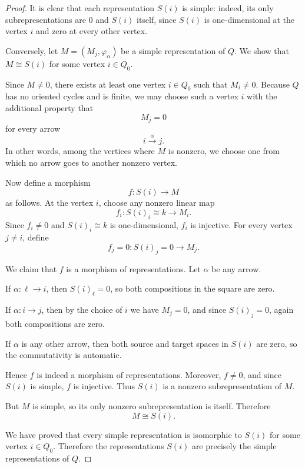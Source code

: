 \documentclass[11pt, a4paper]{report}
\begin{document}
\begin{proof}
    It is clear that each representation $S(i)$ is simple: indeed, its only
    subrepresentations are $0$ and $S(i)$ itself, since $S(i)$ is one-dimensional at
    the vertex $i$ and zero at every other vertex.

    Conversely, let $M=(M_j,\varphi_\alpha)$ be a simple representation of $Q$.
    We show that $M \cong S(i)$ for some vertex $i \in Q_0$.

    Since $M \neq 0$, there exists at least one vertex $i \in Q_0$ such that
    $M_i \neq 0$. Because $Q$ has no oriented cycles and is finite, we may choose
    such a vertex $i$ with the additional property that
    \[
        M_j = 0
    \]
    for every arrow
    \[
        i \xrightarrow{\alpha} j.
    \]
    In other words, among the vertices where $M$ is nonzero, we choose one from
    which no arrow goes to another nonzero vertex.

    Now define a morphism
    \[
        f:S(i)\longrightarrow M
    \]
    as follows. At the vertex $i$, choose any nonzero linear map
    \[
        f_i:S(i)_i \cong k \longrightarrow M_i.
    \]
    Since $f_i \neq 0$ and $S(i)_i \cong k$ is one-dimensional, $f_i$ is injective.
    For every vertex $j \neq i$, define
    \[
        f_j=0:S(i)_j=0 \longrightarrow M_j.
    \]

    We claim that $f$ is a morphism of representations. Let $\alpha$ be any arrow.

    If $\alpha:\ell \to i$, then $S(i)_\ell=0$, so both compositions in the square
    are zero.

    If $\alpha:i \to j$, then by the choice of $i$ we have $M_j=0$, and since
    $S(i)_j=0$, again both compositions are zero.

    If $\alpha$ is any other arrow, then both source and target spaces in $S(i)$ are
    zero, so the commutativity is automatic.

    Hence $f$ is indeed a morphism of representations. Moreover, $f \neq 0$, and
    since $S(i)$ is simple, $f$ is injective. Thus $S(i)$ is a nonzero subrepresentation
    of $M$.

    But $M$ is simple, so its only nonzero subrepresentation is itself. Therefore
    \[
        M \cong S(i).
    \]

    We have proved that every simple representation is isomorphic to $S(i)$ for some
    vertex $i \in Q_0$. Therefore the representations $S(i)$ are precisely the simple
    representations of $Q$.
\end{proof}
\end{document}
